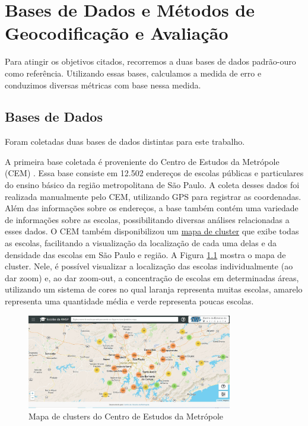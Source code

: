 \chapter{Bases de Dados e Métodos de Geocodificação e Avaliação} \label{desenvolvimento}

Para atingir os objetivos citados, recorremos a duas bases de dados padrão-ouro como referência. Utilizando essas bases, calculamos a medida de erro e conduzimos diversas métricas com base nessa medida.

\section{Bases de Dados}

Foram coletadas duas bases de dados distintas para este trabalho.

A primeira base coletada é proveniente do Centro de Estudos da Metrópole (CEM) \cite{cem}. Essa base consiste em 12.502 endereços de escolas públicas e particulares do ensino básico da região metropolitana de São Paulo. A coleta desses dados foi realizada manualmente pelo CEM, utilizando GPS para registrar as coordenadas. Além das informações sobre os endereços, a base também contém uma variedade de informações sobre as escolas, possibilitando diversas análises relacionadas a esses dados. O CEM também disponibilizou um \href{http://200.144.244.241:3002/geolocation}{mapa de cluster} que exibe todas as escolas, facilitando a visualização da localização de cada uma delas e da densidade das escolas em São Paulo e região. A Figura \ref{fig:siteCEM} mostra o mapa de cluster. Nele, é possível visualizar a localização das escolas individualmente (ao dar zoom) e, ao dar zoom-out, a concentração de escolas em determinadas áreas, utilizando um sistema de cores no qual laranja representa muitas escolas, amarelo representa uma quantidade média e verde representa poucas escolas. 

\begin{figure} 
    \centering
    \includegraphics[width=0.8\textwidth]{Figuras/siteCEM.jpeg}
    \caption{Mapa de clusters do Centro de Estudos da Metrópole}
    \label{fig:siteCEM}
\end{figure} 

